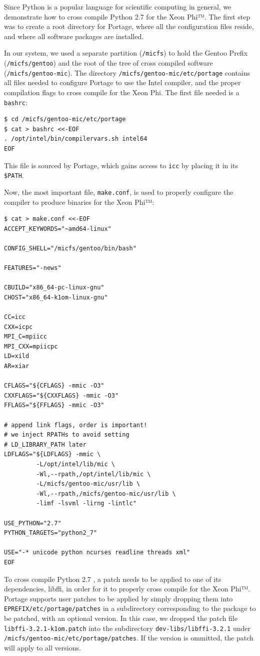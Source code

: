 \documentclass[a4paper,conference]{IEEEtran}
\begin{document}
Since Python is a popular language for scientific computing in general,
we demonstrate how to cross compile Python 2.7 for the Xeon Phi™. The
first step was to create a root directory for Portage, where all the
configuration files reside, and where all software packages are
installed.

In our system, we used a separate partition (\verb|/micfs|) to hold the
Gentoo Prefix (\verb|/micfs/gentoo|) and the root of the tree of cross
compiled software (\verb|/micfs/gentoo-mic|). The directory
\verb|/micfs/gentoo-mic/etc/portage| contains all files needed to
configure Portage to use the Intel compiler, and the proper compilation
flags to cross compile for the Xeon Phi.
The first file needed is a \verb|bashrc|:
\begin{verbatim}
$ cd /micfs/gentoo-mic/etc/portage
$ cat > bashrc <<-EOF
. /opt/intel/bin/compilervars.sh intel64
EOF
\end{verbatim}
This file is sourced by Portage, which gains access to \verb|icc|
by placing it in its \verb|$PATH|.

Now, the most important file, \verb|make.conf|, is used to properly
configure the compiler to produce binaries for the Xeon Phi™:

{\footnotesize
\begin{verbatim}
$ cat > make.conf <<-EOF
ACCEPT_KEYWORDS="~amd64-linux"

CONFIG_SHELL="/micfs/gentoo/bin/bash"

FEATURES="-news"

CBUILD="x86_64-pc-linux-gnu"
CHOST="x86_64-k1om-linux-gnu"

CC=icc
CXX=icpc
MPI_C=mpiicc
MPI_CXX=mpiicpc
LD=xild
AR=xiar

CFLAGS="${CFLAGS} -mmic -O3"
CXXFLAGS="${CXXFLAGS} -mmic -O3"
FFLAGS="${FFLAGS} -mmic -O3"

# append link flags, order is important!
# we inject RPATHs to avoid setting
# LD_LIBRARY_PATH later
LDFLAGS="${LDFLAGS} -mmic \
         -L/opt/intel/lib/mic \
         -Wl,--rpath,/opt/intel/lib/mic \
         -L/micfs/gentoo-mic/usr/lib \
         -Wl,--rpath,/micfs/gentoo-mic/usr/lib \
         -limf -lsvml -lirng -lintlc"

USE_PYTHON="2.7"
PYTHON_TARGETS="python2_7"

USE="-* unicode python ncurses readline threads xml"
EOF
\end{verbatim}
}

To cross compile Python 2.7 \cite{python-k1om-youtube}, a patch
\cite{libffi-k1om} needs to be applied to one of its dependencies,
libffi, in order for it to properly cross compile for the Xeon Phi™.
Portage supports user patches to be applied by simply dropping them into
\verb|EPREFIX/etc/portage/patches| in a subdirectory corresponding to
the package to be patched, with an optional version. In this case, we
dropped the patch file \verb|libffi-3.2.1-k1om.patch| into the
subdirectory \verb|dev-libs/libffi-3.2.1| under
\verb|/micfs/gentoo-mic/etc/portage/patches|. If the version is
ommitted, the patch will apply to all versions.
\end{document}
